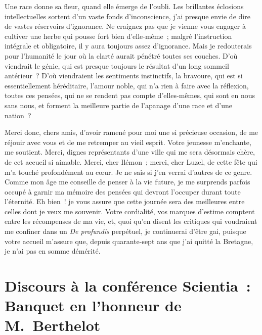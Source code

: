 \documentclass[french,twoside]{book} %
\newcommand\persName[1]{#1}
\newcommand\placeName[1]{#1}
\begin{document}
Une race donne sa fleur, quand elle émerge de l’oubli. Les brillantes éclosions intellectuelles sortent d’un vaste fonds d’inconscience, j’ai presque envie de dire de vastes réservoirs d’ignorance. Ne craignez pas que je vienne vous engager à cultiver une herbe qui pousse fort bien d’elle-même ; malgré l’instruction intégrale et obligatoire, il y aura toujours assez d’ignorance. Mais je redouterais pour l’humanité le jour où la clarté aurait pénétré toutes ses couches. D’où viendrait le génie, qui est presque toujours le résultat d’un long sommeil antérieur ? D’où viendraient les sentiments instinctifs, la bravoure, qui est si essentiellement héréditaire, l’amour noble, qui n’a rien à faire avec la réflexion, toutes ces pensées, qui ne se rendent pas compte d’elles-mêmes, qui sont en nous sans nous, et forment la meilleure partie de l’apanage d’une race et d’une nation ?\par
Merci donc, chers amis, d’avoir ramené pour moi une si précieuse occasion, de me réjouir avec vous et de me retremper au vieil esprit. Votre jeunesse m’enchante, me soutient. Merci, dignes représentants d’une ville qui me sera désormais chère, de cet accueil si aimable. Merci, cher {\persName Ilémon} ; merci, cher {\persName Luzel}, de cette fête qui m’a touché profondément au cœur. Je ne sais si j’en verrai d’autres de ce genre. Comme mon âge me conseille de penser à la vie future, je me surprends parfois occupé à garnir ma mémoire des pensées qui devront l’occuper durant toute l’éternité. Eh bien ! je vous assure que cette journée sera des meilleures entre celles dont je veux me souvenir. Votre cordialité, vos marques d’estime comptent entre les récompenses de ma vie, et, quoi qu’en disent les critiques qui voudraient me confiner dans un {\itshape De profundis} perpétuel, je continuerai d’être gai, puisque votre accueil m’assure que, depuis quarante-sept ans que j’ai quitté la {\placeName Bretagne}, je n’ai pas en somme démérité.
\section[{Discours à la conférence Scientia : Banquet en l’honneur de M. Berthelot}]{Discours à la conférence Scientia : \\
Banquet en l’honneur de {\persName M. Berthelot}}\renewcommand{\leftmark}{Discours à la conférence Scientia : \\
Banquet en l’honneur de {\persName M. Berthelot}}
\end{document}
